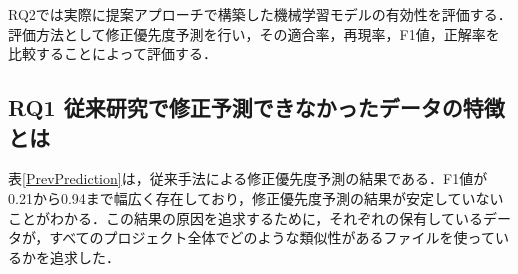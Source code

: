 \documentclass[T,J]{fose} %
\begin{document}
RQ2では実際に提案アプローチで構築した機械学習モデルの有効性を評価する．評価方法として修正優先度予測を行い，その適合率，再現率，F1値，正解率を比較することによって評価する．





\subsection{RQ1 従来研究で修正予測できなかったデータの特徴とは}

表\ref{PrevPrediction}は，従来手法による修正優先度予測の結果である．F1値が0.21から0.94まで幅広く存在しており，修正優先度予測の結果が安定していないことがわかる．この結果の原因を追求するために，それぞれの保有しているデータが，すべてのプロジェクト全体でどのような類似性があるファイルを使っているかを追求した．
\end{document}
